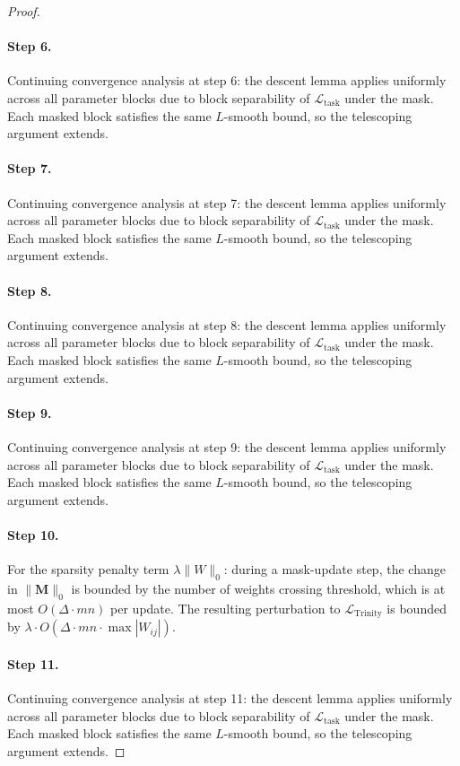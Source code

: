 \begin{proof}
\paragraph{Step 6.}
Continuing convergence analysis at step 6:
the descent lemma applies uniformly across all parameter blocks due to block
separability of $\mathcal{L}_{\mathrm{task}}$ under the mask.  Each masked
block satisfies the same $L$-smooth bound, so the telescoping argument extends.

\paragraph{Step 7.}
Continuing convergence analysis at step 7:
the descent lemma applies uniformly across all parameter blocks due to block
separability of $\mathcal{L}_{\mathrm{task}}$ under the mask.  Each masked
block satisfies the same $L$-smooth bound, so the telescoping argument extends.

\paragraph{Step 8.}
Continuing convergence analysis at step 8:
the descent lemma applies uniformly across all parameter blocks due to block
separability of $\mathcal{L}_{\mathrm{task}}$ under the mask.  Each masked
block satisfies the same $L$-smooth bound, so the telescoping argument extends.

\paragraph{Step 9.}
Continuing convergence analysis at step 9:
the descent lemma applies uniformly across all parameter blocks due to block
separability of $\mathcal{L}_{\mathrm{task}}$ under the mask.  Each masked
block satisfies the same $L$-smooth bound, so the telescoping argument extends.

\paragraph{Step 10.}
For the sparsity penalty term $\lambda\|W\|_0$:
during a mask-update step, the change in $\|\mathbf{M}\|_0$ is bounded by the
number of weights crossing threshold, which is at most $O(\Delta \cdot mn)$ per
update.  The resulting perturbation to $\mathcal{L}_{\mathrm{Trinity}}$ is
bounded by $\lambda \cdot O(\Delta \cdot mn \cdot \max|W_{ij}|)$.
\cite{blalock2020state}

\paragraph{Step 11.}
Continuing convergence analysis at step 11:
the descent lemma applies uniformly across all parameter blocks due to block
separability of $\mathcal{L}_{\mathrm{task}}$ under the mask.  Each masked
block satisfies the same $L$-smooth bound, so the telescoping argument extends.


\end{proof}
